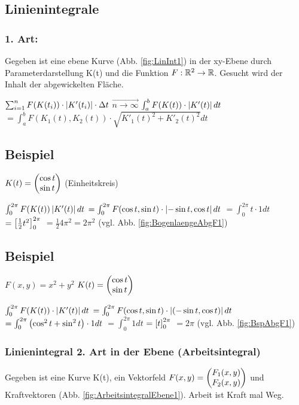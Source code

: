 \subsection{Linienintegrale}

\subsubsection{1. Art:} Gegeben ist eine ebene Kurve (Abb. \ref{fig:LinInt1}) in der xy-Ebene durch Parameterdarstellung K(t) und die Funktion $F: \mathbb{R}^2 \rightarrow \mathbb{R}$.
Gesucht wird der Inhalt der abgewickelten Fläche. 

$\sum_{i=1}^{n} F(K(t_i)) \cdot  \left\vert K'(t_i) \right\vert  \cdot \Delta t $
$\overrightarrow{n \rightarrow \infty}  $ 
$\int_{a}^{b} F(K(t)) \cdot  \left\vert K'(t) \right\vert  dt$
$=\int_{a}^{b} F(K_1(t), K_2(t)) \cdot \sqrt{K'_1(t)^2 + K'_2(t)^2} dt$

\subsection{Beispiel}
$ K(t) =  \begin{pmatrix} \cos t \\ \sin t \end{pmatrix}  $ (Einheitskreis)

$\int_{0}^{2\pi} F(K(t))  \left\vert K'(t) \right\vert  dt$
$=\int_{0}^{2\pi} F(\cos t, \sin t) \cdot  \left\vert - \sin t, \cos t \right\vert  dt$
$=\int_{0}^{2\pi} t \cdot 1 dt $
$= \left[ \frac{1}{2} t^2 \right] _0^{2\pi}$
$=\frac{1}{2} 4\pi^2 = 2\pi^2$ (vgl. Abb. \ref{fig:BogenlaengeAbgF1})

\subsection{Beispiel}
$F(x,y) = x^2 + y^2$
$K(t) =  \begin{pmatrix} \cos t \\ \sin t \end{pmatrix} $

$\int_{0}^{2\pi} F(K(t)) \cdot  \left\vert K'(t) \right\vert  dt$
$=\int_{0}^{2\pi} F(\cos t, \sin t) \cdot  \left\vert (-\sin t, \cos t) \right\vert  dt$
$=\int_{0}^{2\pi}  \left( \cos^2 t + \sin^2 t \right)  \cdot 1 dt$
$=\int_{0}^{2\pi} 1 dt$
$=  \left[ t \right] _0^{2\pi} $
$= 2\pi$ (vgl. Abb. \ref{fig:BspAbgF1})

\subsubsection{Linienintegral 2. Art in der Ebene (Arbeitsintegral)}
\label{sec:linienintegral_arbeitsintegral}
Gegeben ist eine Kurve K(t), ein Vektorfeld $F(x,y) =  \begin{pmatrix} F_1(x,y) \\ F_2(x,y) \end{pmatrix} $ und Kraftvektoren (Abb. \ref{fig:ArbeitsintegralEbene1}). 
Arbeit ist Kraft mal Weg. 

